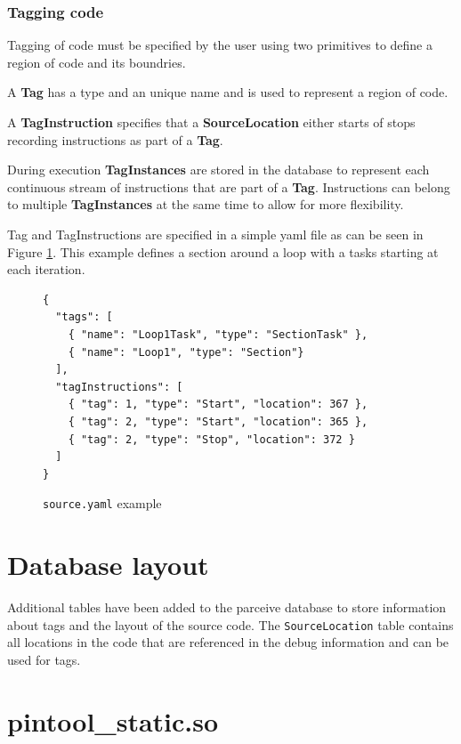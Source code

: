 \subsubsection{Tagging code}

Tagging of code must be specified by the user using two primitives to define a region of code and its boundries.

A \textbf{Tag} has a type and an unique name and is used to represent a region of code.

A \textbf{TagInstruction} specifies that a \textbf{SourceLocation} either starts of stops recording instructions as part of a \textbf{Tag}.

During execution \textbf{TagInstances} are stored in the database to represent each continuous stream of instructions that are part of a \textbf{Tag}. Instructions can belong to multiple \textbf{TagInstances} at the same time to allow for more flexibility.

Tag and TagInstructions are specified in a simple yaml file as can be seen in Figure \ref{cap3:source-example}. This example defines a section around a loop with a tasks starting at each iteration.

\begin{figure}
	\begin{center}
		\begin{verbatim}
{
  "tags": [
    { "name": "Loop1Task", "type": "SectionTask" },
    { "name": "Loop1", "type": "Section"}
  ],
  "tagInstructions": [
    { "tag": 1, "type": "Start", "location": 367 },
    { "tag": 2, "type": "Start", "location": 365 },
    { "tag": 2, "type": "Stop", "location": 372 }
  ]
}
		\end{verbatim}
	\end{center}
	\caption{\texttt{source.yaml} example}
	\label{cap3:source-example}
\end{figure}

\section{Database layout}

Additional tables have been added to the parceive database to store information about tags and the layout of the source code. The \texttt{SourceLocation} table contains all locations in the code that are referenced in the debug information and can be used for tags.

\section{pintool\_static.so}
\label{cap3:pintoolstatic}

